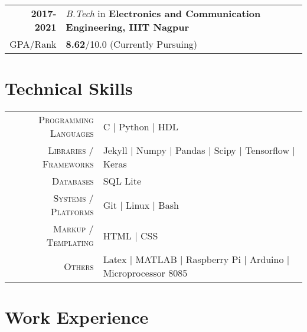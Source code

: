 \documentclass[a4paper,10pt]{extarticle} %
\begin{document}
\begin{tabular}{r|p{17.5cm}}	
\textbf{2017-2021} & \textit{B.Tech} in \textbf{Electronics and Communication Engineering, IIIT Nagpur}\\
\hfill GPA/Rank & \textbf{8.62}/10.0 (Currently Pursuing) %
\end{tabular}

\vspace{-0.2cm}
\section{\textcolor{primary}{Technical Skills}}

\begin{tabular}{r|p{15cm}}
\textsc{Programming Languages} & C | Python | HDL  \\
\textsc{Libraries / Frameworks} & Jekyll | Numpy | Pandas | Scipy | Tensorflow | Keras\\
\textsc{Databases} & SQL Lite \\
\textsc{Systems / Platforms} & Git | Linux | Bash\\
\textsc{Markup / Templating} & HTML | CSS \\
\textsc{Others} &  Latex | MATLAB | Raspberry Pi | Arduino | Microprocessor 8085
\end{tabular}


\vspace{-0.35cm}
\section{\textcolor{primary}{Work Experience}}
\end{document}
